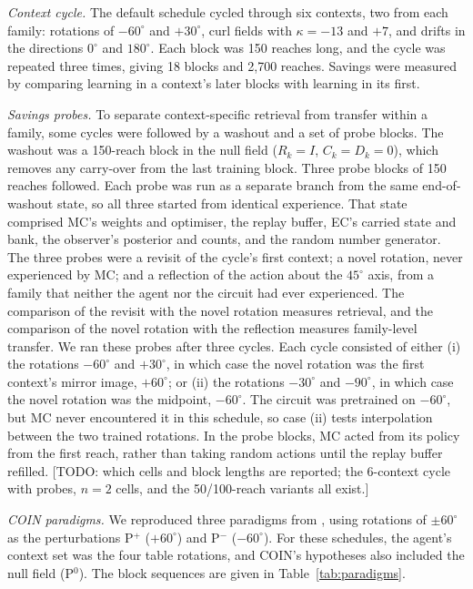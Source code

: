 \textit{Context cycle.} The default schedule cycled through six contexts, two from each family: rotations of $-60^\circ$ and $+30^\circ$, curl fields with $\kappa = -13$ and $+7$, and drifts in the directions $0^\circ$ and $180^\circ$. Each block was 150 reaches long, and the cycle was repeated three times, giving 18 blocks and 2{,}700 reaches. Savings were measured by comparing learning in a context's later blocks with learning in its first.

\textit{Savings probes.} To separate context-specific retrieval from transfer within a family, some cycles were followed by a washout and a set of probe blocks. The washout was a 150-reach block in the null field ($R_k = I$, $C_k = D_k = 0$), which removes any carry-over from the last training block. Three probe blocks of 150 reaches followed. Each probe was run as a separate branch from the same end-of-washout state, so all three started from identical experience. That state comprised MC's weights and optimiser, the replay buffer, EC's carried state and bank, the observer's posterior and counts, and the random number generator. The three probes were a revisit of the cycle's first context; a novel rotation, never experienced by MC; and a reflection of the action about the $45^\circ$ axis, from a family that neither the agent nor the circuit had ever experienced. The comparison of the revisit with the novel rotation measures retrieval, and the comparison of the novel rotation with the reflection measures family-level transfer. We ran these probes after three cycles. Each cycle consisted of either (i) the rotations $-60^\circ$ and $+30^\circ$, in which case the novel rotation was the first context's mirror image, $+60^\circ$; or (ii) the rotations $-30^\circ$ and $-90^\circ$, in which case the novel rotation was the midpoint, $-60^\circ$. The circuit was pretrained on $-60^\circ$, but MC never encountered it in this schedule, so case (ii) tests interpolation between the two trained rotations. In the probe blocks, MC acted from its policy from the first reach, rather than taking random actions until the replay buffer refilled. [TODO: which cells and block lengths are reported; the 6-context cycle with probes, $n = 2$ cells, and the 50/100-reach variants all exist.]

\textit{COIN paradigms.} We reproduced three paradigms from \citet{heald2021contextual}, using rotations of $\pm 60^\circ$ as the perturbations P$^{+}$ ($+60^\circ$) and P$^{-}$ ($-60^\circ$). For these schedules, the agent's context set was the four table rotations, and COIN's hypotheses also included the null field (P$^{0}$). The block sequences are given in Table~\ref{tab:paradigms}.

